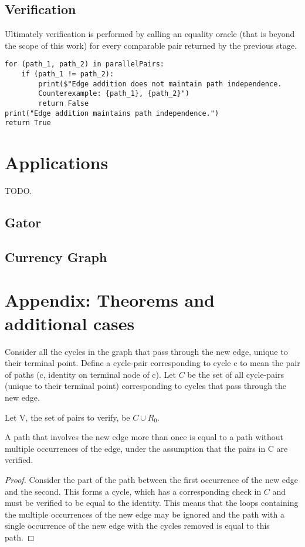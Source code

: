 \documentclass[runningheads]{llncs}
\begin{document}
\subsection{Verification}
Ultimately verification is performed by calling an equality oracle (that is beyond the scope of this work) for every comparable pair returned by the previous stage.

\begin{verbatim}
for (path_1, path_2) in parallelPairs:
    if (path_1 != path_2):
        print($"Edge addition does not maintain path independence. 
        Counterexample: {path_1}, {path_2}")
        return False
print("Edge addition maintains path independence.")
return True
\end{verbatim}

\section{Applications}
TODO.
\subsection{Gator}
\subsection{Currency Graph}

\section{Appendix: Theorems and additional cases}

Consider all the cycles in the graph that pass through the new edge, unique to their terminal point.
Define a cycle-pair corresponding to cycle c to mean the pair of paths (c, identity on terminal node of c).
Let $C$ be the set of all cycle-pairs (unique to their terminal point) corresponding to cycles that pass through the new edge.

Let V, the set of pairs to verify, be $C \cup R_0$.

\begin{lemma}
\label{one_occurence_lemma}
A path that involves the new edge more than once is equal to a path without multiple occurrences of the edge, under the assumption that the pairs in C are verified.
\end{lemma}
\begin{proof}
Consider the part of the path between the first occurrence of the new edge and the second. This forms a cycle, which has a corresponding check in $C$ and must be verified to be equal to the identity.
This means that the loops containing the multiple occurrences of the new edge may be ignored and the path with a single occurrence of the new edge with the cycles removed is equal to this path.
\end{proof}
\end{document}
